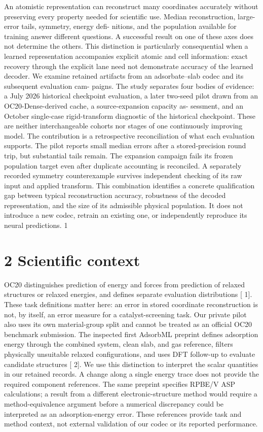 \documentclass[11pt]{article}
\begin{document}
An atomistic representation can reconstruct many coordinates accurately without preserving every
property needed for scientific use. Median reconstruction, large-error tails, symmetry, energy defi-
nitions, and the population available for training answer different questions. A successful result on
one of these axes does not determine the others. This distinction is particularly consequential when
a learned representation accompanies explicit atomic and cell information: exact recovery through
the explicit lane need not demonstrate accuracy of the learned decoder.
We examine retained artifacts from an adsorbate–slab codec and its subsequent evaluation cam-
paigns. The study separates four bodies of evidence: a July 2026 historical checkpoint evaluation,
a later two-seed pilot drawn from an OC20-Dense-derived cache, a source-expansion capacity as-
sessment, and an October single-case rigid-transform diagnostic of the historical checkpoint. These
are neither interchangeable cohorts nor stages of one continuously improving model.
The contribution is a retrospective reconciliation of what each evaluation supports. The pilot
reports small median errors after a stored-precision round trip, but substantial tails remain. The
expansion campaign fails its frozen population target even after duplicate accounting is reconciled.
A separately recorded symmetry counterexample survives independent checking of its raw input
and applied transform. This combination identifies a concrete qualification gap between typical
reconstruction accuracy, robustness of the decoded representation, and the size of its admissible
physical population. It does not introduce a new codec, retrain an existing one, or independently
reproduce its neural predictions.
1


\section*{2 Scientific context}

OC20 distinguishes prediction of energy and forces from prediction of relaxed structures or relaxed
energies, and defines separate evaluation distributions [ 1]. These task definitions matter here: an
error in stored coordinate reconstruction is not, by itself, an error measure for a catalyst-screening
task. Our private pilot also uses its own material-group split and cannot be treated as an official
OC20 benchmark submission.
The inspected first AdsorbML preprint defines adsorption energy through the combined system,
clean slab, and gas reference, filters physically unsuitable relaxed configurations, and uses DFT
follow-up to evaluate candidate structures [ 2]. We use this distinction to interpret the scalar
quantities in our retained records. A change along a single energy trace does not provide the
required component references. The same preprint specifies RPBE/V ASP calculations; a result
from a different electronic-structure method would require a method-equivalence argument before
a numerical discrepancy could be interpreted as an adsorption-energy error. These references
provide task and method context, not external validation of our codec or its reported performance.
\end{document}

